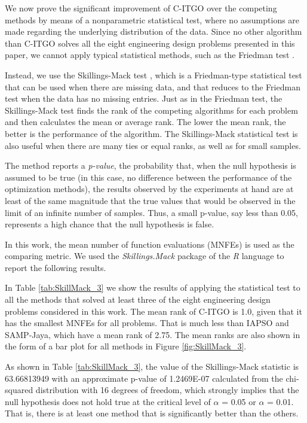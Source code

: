 We now prove the significant improvement of C-ITGO over the competing methods by means of a nonparametric statistical test, where no assumptions are made regarding the underlying distribution of the data. Since no other algorithm than C-ITGO solves all the eight engineering design problems presented in this paper, we cannot apply typical statistical methods, such as the Friedman test \citep{Friedman}.

Instead, we use the Skillings-Mack test \citep{Skillings}, which is a Friedman\allowbreak-type statistical test that can be used when there are missing data, and that reduces to the Friedman test when the data has no missing entries. Just as in the Friedman test, the Skillings-Mack test finds the rank of the competing algorithms for each problem and then calculates the mean or average rank. The lower the mean rank, the better is the performance of the algorithm. The Skillings-Mack statistical test is also useful when there are many ties or equal ranks, as well as for small samples.

The method reports a \textit{p-value}, the probability that, when the null hypothesis is assumed to be true (in this case, no difference between the performance of the optimization methods), the results observed by the experiments at hand are at least of the same magnitude that the true values that would be observed in the limit of an infinite number of samples. Thus, a small p-value, say less than 0.05, represents a high chance that the null hypothesis is false.

In this work, the mean number of function evaluations (MNFEs) is used as the comparing metric. We used the \textit{Skillings.Mack} package \citep{SkillMack} of the \textit{R} language \citep{R} to report the following results.

In Table \ref{tab:SkillMack_3} we show the results of applying the statistical test to all the methods that solved at least three of the eight engineering design problems considered in this work. The mean rank of C-ITGO is 1.0, given that it has the smallest MNFEs for all problems. That is much less than IAPSO and SAMP-Jaya, which have a mean rank of 2.75. The mean ranks are also shown in the form of a bar plot for all methods in Figure \ref{fig:SkillMack_3}.





As shown in Table \ref{tab:SkillMack_3}, the value of the Skillings-Mack statistic is 63.66813949 with an approximate p-value of 1.2469E-07 calculated from the chi-squared distribution with 16 degrees of freedom, which strongly implies that the null hypothesis does not hold true at the critical level of $\alpha$ = 0.05 or $\alpha$ = 0.01. That is, there is at least one method that is significantly better than the others. 



